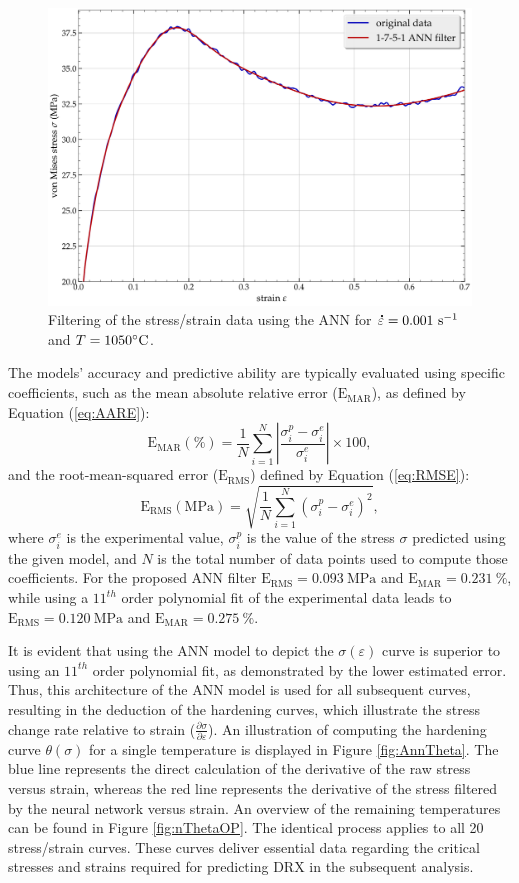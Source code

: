 \documentclass[metals,article,submit,pdftex,moreauthors]{Definitions/mdpi}
\DeclareRobustCommand{\mdot}[1]{\accentset{\mbox{\bfseries .}}{#1}}
\DeclareRobustCommand{\RMSE}{\text{E}_\text{RMS}}
\DeclareRobustCommand{\MARE}{\text{E}_\text{MAR}}
\DeclareRobustCommand{\ps}{\text{s}^{-1}}
\DeclareRobustCommand{\MPa}{\text{MPa}}
\begin{document}
\begin{figure}[H]
\centering
\includegraphics[width=0.7\columnwidth]{Figures/AnnFit}
\caption{Filtering of the stress/strain data using the ANN for $\mdot\varepsilon=0.001~\ps$ and $T=1050\celsius$.}
\label{fig:AnnFit}
\end{figure}
The models' accuracy and predictive ability are typically evaluated using specific coefficients, such as the mean absolute relative error ($\MARE$), as defined by Equation (\ref{eq:AARE}):
\begin{equation}
\MARE(\%) = \frac{1}{N} \sum_{i=1}^{N}{\left|\frac{\sigma_i^p -\sigma_i^e}{\sigma_i^e}\right|} \times 100, \label{eq:AARE}
\end{equation}
and the root-mean-squared error ($\RMSE$) defined by Equation (\ref{eq:RMSE}):
\begin{equation}
\RMSE (\MPa) = \sqrt{\frac{1}{N} \sum_{i=1}^{N} \left(\sigma_i^p - \sigma_i^e\right)^2}, \label{eq:RMSE}
\end{equation}
where $\sigma_i^e$ is the experimental value, $\sigma_i^p$ is the value of the stress $\sigma$ predicted using the given model, and $N$ is the total number of data points used to compute those coefficients.
For the proposed ANN filter $\RMSE=0.093~\MPa$ and $\MARE=0.231~\%$, while using a $11^{th}$ order polynomial fit of the experimental data leads to $\RMSE=0.120~\MPa$ and $\MARE=0.275~\%$.

It is evident that using the ANN model to depict the $\sigma(\varepsilon)$ curve is superior to using an $11^{th}$ order polynomial fit, as demonstrated by the lower estimated error.
Thus, this architecture of the ANN model is used for all subsequent curves, resulting in the deduction of the hardening curves, which illustrate the stress change rate relative to strain ($\frac{\partial \sigma}{\partial \varepsilon}$).
An illustration of computing the hardening curve $\theta(\sigma)$ for a single temperature is displayed in Figure \ref{fig:AnnTheta}.
The blue line represents the direct calculation of the derivative of the raw stress versus strain, whereas the red line represents the derivative of the stress filtered by the neural network versus strain.
An overview of the remaining temperatures can be found in Figure \ref{fig:nThetaOP}.
The identical process applies to all 20 stress/strain curves.
These curves deliver essential data regarding the critical stresses and strains required for predicting DRX in the subsequent analysis.
\end{document}
